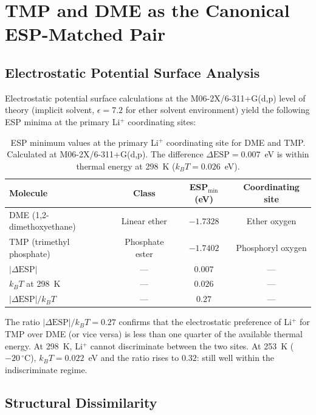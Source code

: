 \documentclass[11pt]{article}
\theoremstyle{plain}
\theoremstyle{definition}
\theoremstyle{remark}
\begin{document}
\section{TMP and DME as the Canonical ESP-Matched Pair}
\label{sec:tmp_dme}

\subsection{Electrostatic Potential Surface Analysis}

Electrostatic potential surface calculations at the M06-2X/6-311+G(d,p)
level of theory (implicit solvent, $\epsilon = 7.2$ for ether solvent
environment) yield the following ESP minima at the primary Li$^+$
coordinating sites:

\begin{table}[h!]
\centering
\caption{ESP minimum values at the primary Li$^+$ coordinating site for
DME and TMP.  Calculated at M06-2X/6-311+G(d,p).  The difference
$\Delta\mathrm{ESP} = 0.007$~eV is within thermal energy at 298~K
($k_BT = 0.026$~eV).}
\label{tab:esp}
\begin{tabular}{lccc}
\toprule
Molecule & Class & ESP$_{\min}$ (eV) & Coordinating site \\
\midrule
DME (1,2-dimethoxyethane) & Linear ether & $-1.7328$ & Ether oxygen \\
TMP (trimethyl phosphate) & Phosphate ester & $-1.7402$ & Phosphoryl oxygen \\
\midrule
$|\Delta\mathrm{ESP}|$ & --- & $0.007$ & --- \\
$k_BT$ at 298~K & --- & $0.026$ & --- \\
$|\Delta\mathrm{ESP}|/k_BT$ & --- & $0.27$ & --- \\
\bottomrule
\end{tabular}
\end{table}

The ratio $|\Delta\mathrm{ESP}|/k_BT = 0.27$ confirms that the
electrostatic preference of Li$^+$ for TMP over DME (or vice versa)
is less than one quarter of the available thermal energy.  At 298~K,
Li$^+$ cannot discriminate between the two sites.  At 253~K ($-20\,^\circ$C),
$k_BT = 0.022$~eV and the ratio rises to $0.32$: still well within the
indiscriminate regime.

\subsection{Structural Dissimilarity}
\end{document}
